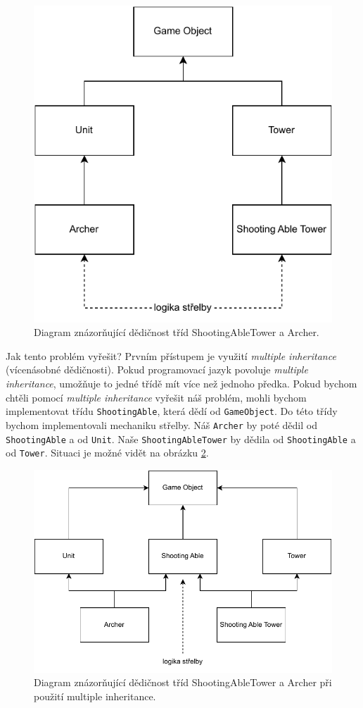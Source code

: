 \begin{figure}
    \centering
    \includegraphics[width=0.6\linewidth]{img/inheritance.pdf}
    \caption{Diagram znázorňující dědičnost tříd ShootingAbleTower a Archer.}
    \label{fig:inheritance}
\end{figure}

Jak tento problém vyřešit? Prvním přístupem je využití \textit{multiple inheritance}  (vícenásobné dědičnosti). Pokud programovací jazyk povoluje \textit{multiple inheritance}, umožňuje to jedné třídě mít více než jednoho předka. Pokud bychom chtěli pomocí \textit{multiple inheritance} vyřešit náš problém, mohli bychom implementovat třídu \verb|ShootingAble|, která dědí od \verb|GameObject|. Do této třídy bychom implementovali mechaniku střelby. Náš \verb|Archer| by poté dědil od \verb|ShootingAble| a od \verb|Unit|. Naše \verb|ShootingAbleTower| by dědila od \verb|ShootingAble| a od \verb|Tower|. Situaci je možné vidět na obrázku \ref{fig:diamong_problem}.

\begin{figure}
    \centering
    \includegraphics[width=0.6\linewidth]{img/diamond_problem.pdf}
    \caption{Diagram znázorňující dědičnost tříd ShootingAbleTower a Archer při použití multiple inheritance.}
    \label{fig:diamong_problem}
\end{figure}


